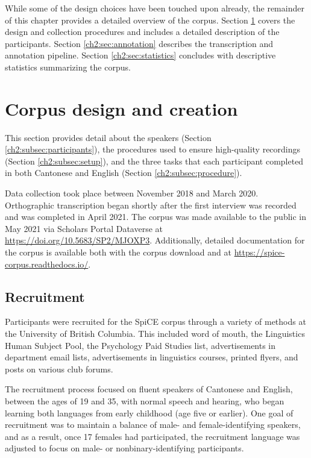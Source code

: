 While some of the design choices have been touched upon already, the remainder of this chapter provides a detailed overview of the corpus. Section \ref{ch2:sec:design} covers the design and collection procedures and includes a detailed description of the participants. Section \ref{ch2:sec:annotation} describes the transcription and annotation pipeline. Section \ref{ch2:sec:statistics} concludes with descriptive statistics summarizing the corpus. 

\section{Corpus design and creation}\label{ch2:sec:design}

This section provides detail about the speakers (Section \ref{ch2:subsec:participants}), the procedures used to ensure high-quality recordings (Section \ref{ch2:subsec:setup}), and the three tasks that each participant completed in both Cantonese and English (Section \ref{ch2:subsec:procedure}). 

Data collection took place between November 2018 and March 2020. Orthographic transcription began shortly after the first interview was recorded and was completed in April 2021. The corpus was made available to the public in May 2021 via Scholars Portal Dataverse at \url{https://doi.org/10.5683/SP2/MJOXP3}. Additionally, detailed documentation for the corpus is available both with the corpus download and at \url{https://spice-corpus.readthedocs.io/}.

\subsection{Recruitment}

Participants were recruited for the SpiCE corpus through a variety of methods at the University of British Columbia. This included word of mouth, the Linguistics Human Subject Pool, the Psychology Paid Studies list, advertisements in department email lists, advertisements in linguistics courses, printed flyers, and posts on various club forums. 

The recruitment process focused on fluent speakers of Cantonese and English, between the ages of 19 and 35, with normal speech and hearing, who began learning both languages from early childhood (age five or earlier). One goal of recruitment was to maintain a balance of male- and female-identifying speakers, and as a result, once 17 females had participated, the recruitment language was adjusted to focus on male- or nonbinary-identifying participants.

